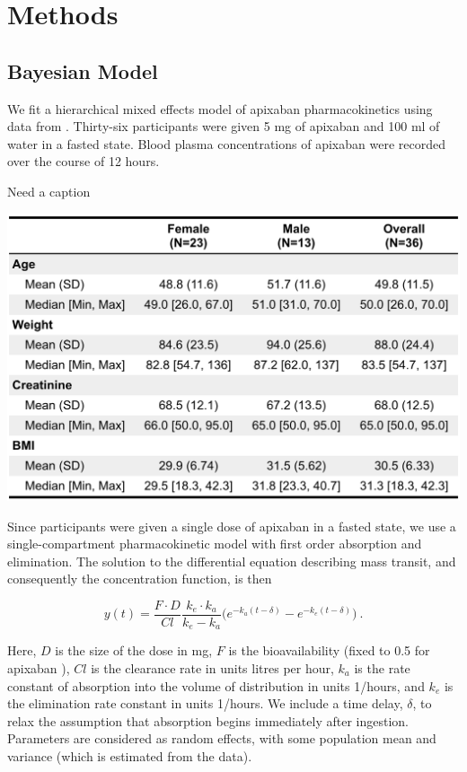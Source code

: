 \section{Methods}

\subsection*{Bayesian Model}

We fit a hierarchical mixed effects model of apixaban pharmacokinetics using data from \cite{Beaton2018-el}.  Thirty-six participants were given 5 mg of apixaban and 100 ml of water in a fasted state. Blood plasma concentrations of apixaban were recorded over the course of 12 hours.



\begin{table}[htb]
	\centering
	\caption{Need a caption} 
	\label{tab:my table} 
	\includegraphics[width=0.7\linewidth]{figs/table1}
\end{table}


\noindent Since participants were given a single dose of apixaban in a fasted state, we use a single-compartment pharmacokinetic model with first order absorption and elimination.  The solution to the differential equation describing mass transit, and consequently the concentration function, is then


\begin{equation} \label{eq:eq_1}
y(t) = \dfrac{F \cdot D}{Cl} \dfrac{k_e \cdot k_a}{k_e - k_a}\Bigg( e^{-k_a (t-\delta)} - e^{-k_e(t-\delta)} \Bigg) \>.
\end{equation}

\noindent Here, $D$ is the size of the dose in mg, $F$ is the bioavailability (fixed to 0.5 for apixaban \cite{Byon2019-gf}), $Cl$ is the clearance rate in units litres per hour, $k_a$ is the rate constant of absorption into the volume of distribution in units 1/hours, and $k_e$ is the elimination rate constant in units 1/hours. We include a time delay, $\delta$, to relax the assumption that absorption begins immediately after ingestion.  Parameters are considered as random effects, with some population mean and variance (which is estimated from the data). 

